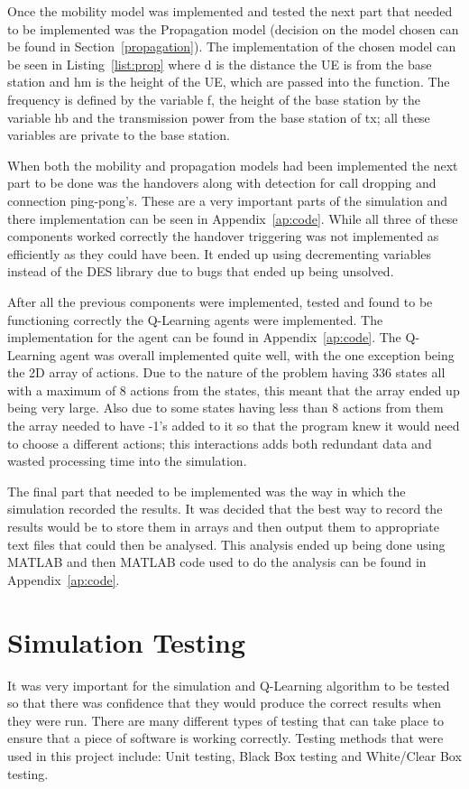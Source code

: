Once the mobility model was implemented and tested the next part that needed to be implemented was the Propagation model (decision on the model chosen can be found in Section~\ref{propagation}). The implementation of the chosen model can be seen in Listing~\ref{list:prop} where d is the distance the UE is from the base station and hm is the height of the UE, which are passed into the function. The frequency is defined by the variable f, the height of the base station by the variable hb and the transmission power from the base station of tx; all these variables are private to the base station.

When both the mobility and propagation models had been implemented the next part to be done was the handovers along with detection for call dropping and connection ping-pong's. These are a very important parts of the simulation and there implementation can be seen in Appendix~\ref{ap:code}. While all three of these components worked correctly the handover triggering was not implemented as efficiently as they could have been. It ended up using decrementing variables instead of the DES library due to bugs that ended up being unsolved.

After all the previous components were implemented, tested and found to be functioning correctly the Q-Learning agents were implemented. The implementation for the agent can be found in Appendix~\ref{ap:code}. The Q-Learning agent was overall implemented quite well, with the one exception being the 2D array of actions. Due to the nature of the problem having 336 states all with a maximum of 8 actions from the states, this meant that the array ended up being very large. Also due to some states having less than 8 actions from them the array needed to have -1’s added to it so that the program knew it would need to choose a different actions; this interactions adds both redundant data and wasted processing time into the simulation. 

The final part that needed to be implemented was the way in which the simulation recorded the results. It was decided that the best way to record the results would be to store them in arrays and then output them to appropriate text files that could then be analysed. This analysis ended up being done using MATLAB and then MATLAB code used to do the analysis can be found in Appendix~\ref{ap:code}. 

\section{Simulation Testing}
It was very important for the simulation and Q-Learning algorithm to be tested so that there was confidence that they would produce the correct results when they were run. There are many different types of testing that can take place to ensure that a piece of software is working correctly. Testing methods that were used in this project include: Unit testing, Black Box testing and White/Clear Box testing.


